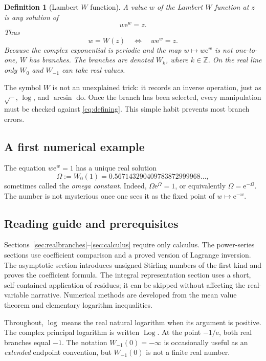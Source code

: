 \documentclass[11pt]{article}
\newtheorem{definition}[definition]{Definition}
\theoremstyle{remark}
\newcommand{\Wm}{W_{-1}}
\newcommand{\ee}{\mathrm e}
\newcommand{\Log}{\operatorname{Log}}
\begin{document}
\begin{definition}[Lambert \(W\) function]
A value \(w\) of the Lambert \(W\) function at \(z\) is any solution of
\begin{equation}\label{eq:defining}
       w\ee^w=z.
\end{equation}
Thus
\[
       w=W(z)\quad\Longleftrightarrow\quad w\ee^w=z.
\]
Because the complex exponential is periodic and the map \(w\mapsto w\ee^w\)
is not one-to-one, \(W\) has branches.  The branches are denoted \(W_k\),
where \(k\in\mathbb Z\).  On the real line only \(W_0\) and \(W_{-1}\) can
take real values.
\end{definition}

The symbol \(W\) is not an unexplained trick: it records an inverse operation,
just as \(\sqrt{\phantom{x}}\), \(\log\), and \(\arcsin\) do.  Once the branch
has been selected, every manipulation must be checked against
\eqref{eq:defining}.  This simple habit prevents most branch errors.

\subsection{A first numerical example}

The equation \(w\ee^w=1\) has a unique real solution
\[
      \Omega:=W_0(1)=0.567143290409783872999968\ldots,
\]
sometimes called the \emph{omega constant}.  Indeed,
\(\Omega\ee^\Omega=1\), or equivalently \(\Omega=\ee^{-\Omega}\).
The number is not mysterious once one sees it as the fixed point of
\(w\mapsto \ee^{-w}\).

\subsection{Reading guide and prerequisites}

Sections~\ref{sec:realbranches}--\ref{sec:calculus} require only calculus.
The power-series sections use coefficient comparison and a proved version of
Lagrange inversion.  The asymptotic section introduces unsigned Stirling
numbers of the first kind and proves the coefficient formula.  The integral
representation section uses a short, self-contained application of residues;
it can be skipped without affecting the real-variable narrative.  Numerical
methods are developed from the mean value theorem and elementary logarithm
inequalities.

Throughout, \(\log\) means the real natural logarithm when its argument is
positive.  The complex principal logarithm is written \(\Log\).  At the point
\(-1/\ee\), both real branches equal \(-1\).  The notation
\(\Wm(0)=-\infty\) is occasionally useful as an \emph{extended} endpoint
convention, but \(\Wm(0)\) is not a finite real number.
\end{document}
